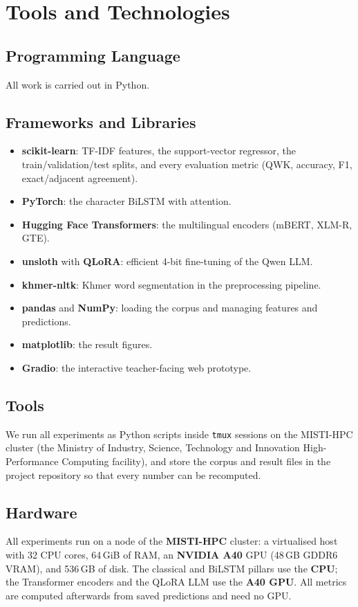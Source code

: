\section{Tools and Technologies}
\label{sec:tools}

\subsection{Programming Language}
All work is carried out in Python.

\subsection{Frameworks and Libraries}
\begin{itemize}[leftmargin=1.4em]
  \item \textbf{scikit-learn}: TF-IDF features, the support-vector regressor, the train/validation/test
  splits, and every evaluation metric (QWK, accuracy, F1, exact/adjacent agreement).
  \item \textbf{PyTorch}: the character BiLSTM with attention.
  \item \textbf{Hugging Face Transformers}: the multilingual encoders (mBERT, XLM-R, GTE).
  \item \textbf{unsloth} with \textbf{QLoRA}: efficient 4-bit fine-tuning of the Qwen LLM.
  \item \textbf{khmer-nltk}: Khmer word segmentation in the preprocessing pipeline.
  \item \textbf{pandas} and \textbf{NumPy}: loading the corpus and managing features and predictions.
  \item \textbf{matplotlib}: the result figures.
  \item \textbf{Gradio}: the interactive teacher-facing web prototype.
\end{itemize}

\subsection{Tools}
We run all experiments as Python scripts inside \texttt{tmux} sessions on the MISTI-HPC cluster (the
Ministry of Industry, Science, Technology and Innovation High-Performance Computing facility), and store
the corpus and result files in the project repository so that every number can be recomputed.

\subsection{Hardware}
All experiments run on a node of the \textbf{MISTI-HPC} cluster: a virtualised host with 32 CPU cores,
64\,GiB of RAM, an \textbf{NVIDIA A40} GPU (48\,GB GDDR6 VRAM), and 536\,GB of disk. The classical and
BiLSTM pillars use the \textbf{CPU}; the Transformer encoders and the QLoRA LLM use the \textbf{A40
GPU}. All metrics are computed afterwards from saved predictions and need no GPU.

